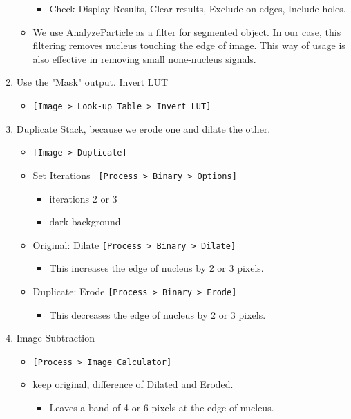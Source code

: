 \documentclass[11pt,a4paper,oneside]{report}
\newcommand{\ijmenu}[1]{\texttt{\small#1}}
\begin{document}
\begin{enumerate}
\begin{itemize}
\begin{itemize}
      \item Check Display Results, Clear results, Exclude on edges, Include holes. 
    \end{itemize}
    \item We use AnalyzeParticle as a filter for segmented object. In our case, this filtering removes nucleus touching the edge of image. This way of usage is also effective in removing small none-nucleus signals. 
  \end{itemize}
  \item Use the "Mask" output. Invert LUT
  \begin{itemize}
    \item \ijmenu{[Image > Look-up Table > Invert LUT]}
  \end{itemize}
  \item Duplicate Stack, because we erode one and dilate the other.
  \begin{itemize}
    \item \ijmenu{[Image > Duplicate]}
    \item Set Iterations \ijmenu{ [Process > Binary > Options]}
    \begin{itemize}
      \item iterations 2 or 3
      \item dark background
    \end{itemize}
    \item Original: Dilate \ijmenu{[Process > Binary > Dilate]}
    \begin{itemize}
      \item This increases the edge of nucleus by 2 or 3 pixels. 
    \end{itemize}
    \item Duplicate: Erode \ijmenu{[Process > Binary > Erode]}
    \begin{itemize}
      \item This decreases the edge of nucleus by 2 or 3 pixels. 
    \end{itemize}
  \end{itemize}
  \item Image Subtraction
  \begin{itemize}
    \item \ijmenu{[Process > Image Calculator]}
    \item keep original, difference of Dilated and Eroded.
    \begin{itemize}
      \item Leaves a band of 4 or 6 pixels at the edge of nucleus. 
    \end{itemize} 
  \end{itemize}
\end{enumerate}
\end{document}

